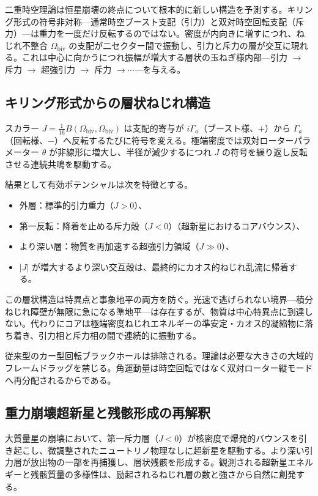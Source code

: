 \documentclass[a4paper]{article}
\begin{document}
二重時空理論は恒星崩壊の終点について根本的に新しい構造を予測する。キリング形式の符号非対称---通常時空ブースト支配（引力）と双対時空回転支配（斥力）---は重力を一度だけ反転するのではない。密度が内向きに増すにつれ、ねじれ不整合 $\Omega_\text{biv}$ の支配が二セクター間で振動し、引力と斥力の層が交互に現れる。これは中心に向かうにつれ振幅が増大する層状の玉ねぎ様内部---引力 $\to$ 斥力 $\to$ 超強引力 $\to$ 斥力 $\to \cdots$---を与える。

\subsection{キリング形式からの層状ねじれ構造}

スカラー $J = \frac{1}{16} B(\Omega_\text{biv}, \Omega_\text{biv})$ は支配的寄与が $i\Gamma_a$（ブースト様、$+$）から $\Gamma_a$（回転様、$-$）へ反転するたびに符号を変える。極端密度では双対ローターパラメーター $\theta$ が非線形に増大し、半径が減少するにつれ $J$ の符号を繰り返し反転させる連続共鳴を駆動する。

結果として有効ポテンシャルは次を特徴とする。
\begin{itemize}
\item 外層：標準的引力重力（$J > 0$）、
\item 第一反転：降着を止める斥力殻（$J < 0$）（超新星におけるコアバウンス）、
\item より深い層：物質を再加速する超強引力領域（$J \gg 0$）、
\item $|J|$ が増大するより深い交互殻は、最終的にカオス的ねじれ乱流に帰着する。
\end{itemize}

この層状構造は特異点と事象地平の両方を防ぐ。光速で逃げられない境界---積分ねじれ障壁が無限に急になる準地平---は存在するが、物質は中心特異点に到達しない。代わりにコアは極端密度ねじれエネルギーの準安定・カオス的凝縮物に落ち着き、引力相と斥力相の間で連続的に振動する。

従来型のカー型回転ブラックホールは排除される。理論は必要な大きさの大域的フレームドラッグを禁じる。角運動量は時空回転ではなく双対ローター縦モードへ再分配されるからである。

\subsection{重力崩壊超新星と残骸形成の再解釈}

大質量星の崩壊において、第一斥力層（$J < 0$）が核密度で爆発的バウンスを引き起こし、微調整されたニュートリノ物理なしに超新星を駆動する。より深い引力層が放出物の一部を再捕獲し、層状残骸を形成する。観測される超新星エネルギーと残骸質量の多様性は、励起されるねじれ層の数と強さから自然に創発する。
\end{document}
